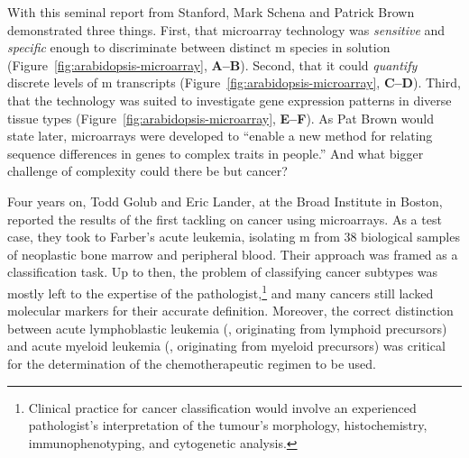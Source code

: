 \bigskip

With this seminal report from Stanford, Mark Schena and Patrick Brown
demonstrated three things.  First, that microarray technology was
\emph{sensitive} and \emph{specific} enough to discriminate between distinct
m species in solution (Figure~\ref{fig:arabidopsis-microarray},
\textbf{A--B}).  Second, that it could \emph{quantify} discrete levels of
m transcripts (Figure~\ref{fig:arabidopsis-microarray},
\textbf{C--D}).  Third, that the technology was suited to investigate gene
expression patterns in diverse tissue types
(Figure~\ref{fig:arabidopsis-microarray}, \textbf{E--F}).  As Pat Brown would
state later, microarrays were developed to ``enable a new method for relating
sequence differences in genes to complex traits in people.''  And what bigger
challenge of complexity could there be but cancer?

Four years on, Todd Golub and Eric Lander, at the Broad Institute in Boston,
reported the results of the first tackling on cancer using
microarrays.\cite{golub_molecular_1999} As a test case, they took to Farber's
acute leukemia, isolating m from 38 biological samples of
neoplastic bone marrow and peripheral blood. Their approach was framed as a
classification task.  Up to then, the problem of classifying cancer subtypes was
mostly left to the expertise of the pathologist,\footnote{Clinical practice for
  cancer classification would involve an experienced pathologist's
  interpretation of the tumour's morphology, histochemistry, immunophenotyping,
  and cytogenetic analysis.} and many cancers still lacked molecular markers for
their accurate definition.  Moreover, the correct distinction between acute
lymphoblastic leukemia (, originating from lymphoid precursors)
and acute myeloid leukemia (, originating from myeloid
precursors) was critical for the determination of the chemotherapeutic regimen
to be used.

